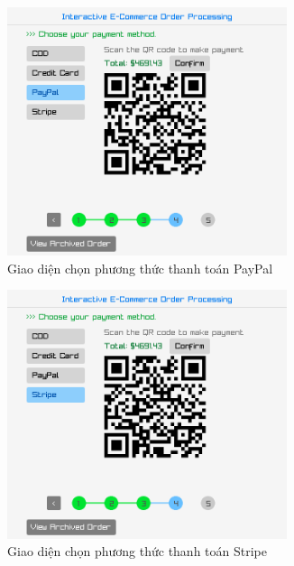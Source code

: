 \documentclass[a4paper,12pt]{report}
\begin{document}
\begin{figure}[!ht]
  \hfill
  \begin{subfigure}{0.46\textwidth}
    \centering
    \includegraphics[width=0.9\textwidth]{../assets/screenshots/gui/payment_paypal.png}
    \caption{Giao diện chọn phương thức thanh toán PayPal}
  \end{subfigure}
  \hfill
  \begin{subfigure}{0.46\textwidth}
    \centering
    \includegraphics[width=0.9\textwidth]{../assets/screenshots/gui/payment_stripe.png}
    \caption{Giao diện chọn phương thức thanh toán Stripe}
  \end{subfigure}
  \hfill
  \begin{subfigure}{0.55\textwidth}

\end{subfigure}
\end{figure}
\end{document}
